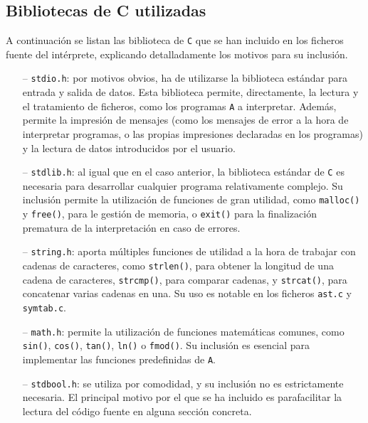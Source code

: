 \documentclass[12pt]{article}
\begin{document}
\subsection{Bibliotecas de C utilizadas}
A continuación se listan las biblioteca de \texttt{C} que se han incluido en los ficheros fuente del intérprete, explicando detalladamente los motivos para su inclusión.
\begin{itemize}
    \item[--] \texttt{stdio.h}: por motivos obvios, ha de utilizarse la biblioteca estándar para entrada y salida de datos. Esta biblioteca permite, directamente, la lectura y el tratamiento de ficheros, como los programas \texttt{A} a interpretar. Además, permite la impresión de mensajes (como los mensajes de error a la hora de interpretar programas, o las propias impresiones declaradas en los programas) y la lectura de datos introducidos por el usuario.
    \item[--] \texttt{stdlib.h}: al igual que en el caso anterior, la biblioteca estándar de \texttt{C} es necesaria para desarrollar cualquier programa relativamente complejo. Su inclusión permite la utilización de funciones de gran utilidad, como \texttt{malloc()} y \texttt{free()}, para le gestión de memoria, o \texttt{exit()} para la finalización prematura de la interpretación en caso de errores.
    \item[--] \texttt{string.h}: aporta múltiples funciones de utilidad a la hora de trabajar con cadenas de caracteres, como \texttt{strlen()}, para obtener la longitud de una cadena de caracteres, \texttt{strcmp()}, para comparar cadenas, y \texttt{strcat()}, para concatenar varias cadenas en una. Su uso es notable en los ficheros \texttt{ast.c} y \texttt{symtab.c}.
    \item[--] \texttt{math.h}: permite la utilización de funciones matemáticas comunes, como \texttt{sin()}, \texttt{cos()}, \texttt{tan()}, \texttt{ln()} o \texttt{fmod()}. Su inclusión es esencial para implementar las funciones predefinidas de \texttt{A}.
    \item[--] \texttt{stdbool.h}: se utiliza por comodidad, y su inclusión no es estrictamente necesaria. El principal motivo por el que se ha incluido es parafacilitar la lectura del código fuente en alguna sección concreta.
\end{itemize}
\end{document}
